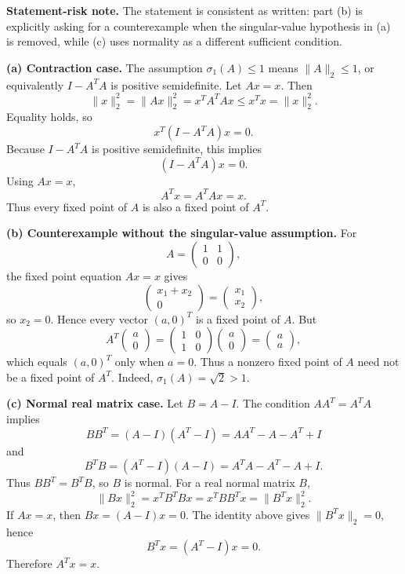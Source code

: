 \begin{solution}
\textbf{Statement-risk note.}
The statement is consistent as written: part (b) is explicitly asking for a
counterexample when the singular-value hypothesis in (a) is removed, while (c)
uses normality as a different sufficient condition.

\textbf{(a) Contraction case.}
The assumption $\sigma_1(A)\leq 1$ means $\|A\|_2\leq 1$, or equivalently
$I-A^TA$ is positive semidefinite. Let $Ax=x$. Then
\[
\|x\|_2^2=\|Ax\|_2^2=x^TA^TAx\leq x^Tx=\|x\|_2^2.
\]
Equality holds, so
\[
x^T(I-A^TA)x=0.
\]
Because $I-A^TA$ is positive semidefinite, this implies
\[
(I-A^TA)x=0.
\]
Using $Ax=x$,
\[
A^Tx=A^TAx=x.
\]
Thus every fixed point of $A$ is also a fixed point of $A^T$.

\textbf{(b) Counterexample without the singular-value assumption.}
For
\[
A=
\begin{pmatrix}
1 & 1\\
0 & 0
\end{pmatrix},
\]
the fixed point equation $Ax=x$ gives
\[
\begin{pmatrix}
x_1+x_2\\
0
\end{pmatrix}
=
\begin{pmatrix}
x_1\\
x_2
\end{pmatrix},
\]
so $x_2=0$. Hence every vector $(a,0)^T$ is a fixed point of $A$. But
\[
A^T
\begin{pmatrix}
a\\
0
\end{pmatrix}
=
\begin{pmatrix}
1 & 0\\
1 & 0
\end{pmatrix}
\begin{pmatrix}
a\\
0
\end{pmatrix}
=
\begin{pmatrix}
a\\
a
\end{pmatrix},
\]
which equals $(a,0)^T$ only when $a=0$. Thus a nonzero fixed point of $A$ need not be a fixed
point of $A^T$. Indeed, $\sigma_1(A)=\sqrt{2}>1$.

\textbf{(c) Normal real matrix case.}
Let $B=A-I$. The condition $AA^T=A^TA$ implies
\[
BB^T=(A-I)(A^T-I)=AA^T-A-A^T+I
\]
and
\[
B^TB=(A^T-I)(A-I)=A^TA-A^T-A+I.
\]
Thus $BB^T=B^TB$, so $B$ is normal. For a real normal matrix $B$,
\[
\|Bx\|_2^2=x^TB^TBx=x^TBB^Tx=\|B^Tx\|_2^2.
\]
If $Ax=x$, then $Bx=(A-I)x=0$. The identity above gives $\|B^Tx\|_2=0$, hence
\[
B^Tx=(A^T-I)x=0.
\]
Therefore $A^Tx=x$.
\end{solution}

